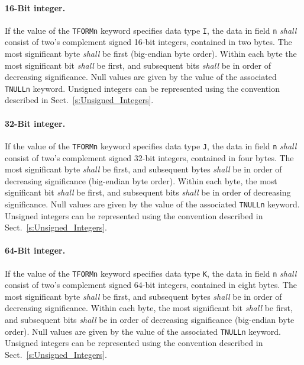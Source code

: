 \documentclass[onecolumn]{aa}
\begin{document}
    \paragraph{16-Bit integer.} 
    If the value of 
    the {\tt TFORMn} keyword specifies data type {\tt I}, the 
    data in field {\tt n} {\em shall} consist
    of two's complement signed 16-bit integers, 
    contained in two bytes.
    The most significant byte {\em shall} be first
    (big-endian byte order).
    Within each byte the 
    most significant bit {\em shall} be first, and 
    subsequent bits {\em shall} be in order of decreasing significance.     
    Null values are given by the value of the 
    associated {\tt TNULLn} keyword.
    Unsigned integers can be represented using the convention described 
    in Sect.\ \ref{s:Unsigned_Integers}.

    \paragraph{32-Bit integer.} 
    If the value of 
    the {\tt TFORMn} keyword specifies data type {\tt J}, the 
    data in field {\tt n} {\em shall} consist
    of two's complement signed 32-bit integers, 
    contained in four bytes.
    The most significant byte {\em shall} be first, and 
    subsequent bytes {\em shall} be in order of decreasing significance (big-endian byte order). 
    Within each byte, the most significant bit {\em shall} be first, and 
    subsequent bits {\em shall} be in order of decreasing significance. 
    Null values are given by the value of the 
    associated {\tt TNULLn} keyword.
    Unsigned integers can be represented using the convention described 
    in Sect.\ \ref{s:Unsigned_Integers}.

    \paragraph{64-Bit integer.} 
    If the value of 
    the {\tt TFORMn} keyword specifies data type {\tt K}, the 
    data in field {\tt n} {\em shall} consist
    of two's complement signed 64-bit integers, 
    contained in eight bytes.
    The most significant byte {\em shall} be first, and 
    subsequent bytes {\em shall} be in order of decreasing significance. 
    Within each byte, the most significant bit {\em shall} be first, and 
    subsequent bits {\em shall} be in order of decreasing significance (big-endian byte order). 
    Null values are given by the value of the 
    associated {\tt TNULLn} keyword.
    Unsigned integers can be represented using the convention described 
    in Sect.\ \ref{s:Unsigned_Integers}.
\end{document}
